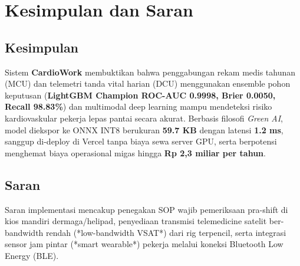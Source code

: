 \documentclass[a4paper,11pt]{article}
\begin{document}
\section{Kesimpulan dan Saran}

\subsection{Kesimpulan}
Sistem \textbf{CardioWork} membuktikan bahwa penggabungan rekam medis tahunan (MCU) dan telemetri tanda vital harian (DCU) menggunakan ensemble pohon keputusan (\textbf{LightGBM Champion ROC-AUC 0.9998, Brier 0.0050, Recall 98.83\%}) dan multimodal deep learning mampu mendeteksi risiko kardiovaskular pekerja lepas pantai secara akurat. Berbasis filosofi \textit{Green AI}, model diekspor ke ONNX INT8 berukuran \textbf{59.7 KB} dengan latensi \textbf{1.2 ms}, sanggup di-deploy di Vercel tanpa biaya sewa server GPU, serta berpotensi menghemat biaya operasional migas hingga \textbf{Rp 2,3 miliar per tahun}.

\subsection{Saran}
Saran implementasi mencakup penegakan SOP wajib pemeriksaan pra-shift di kios mandiri dermaga/helipad, penyediaan transmisi telemedicine satelit ber-bandwidth rendah (*low-bandwidth VSAT*) dari rig terpencil, serta integrasi sensor jam pintar (*smart wearable*) pekerja melalui koneksi Bluetooth Low Energy (BLE).
\end{document}
